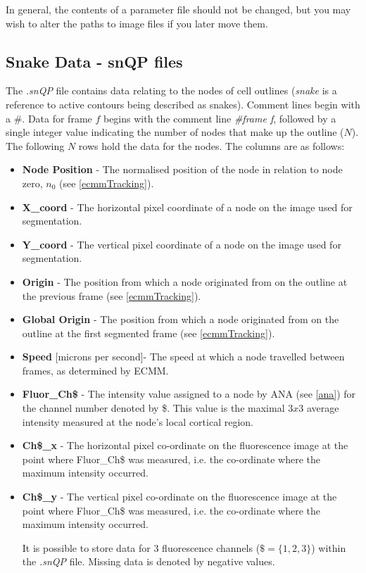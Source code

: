 \documentclass[a4paper,12pt]{article}
\begin{document}
In general, the contents of a parameter file should not be changed, but you may wish to alter the paths to
image files if you later move them.
 

\subsection{Snake Data - snQP files}
\label{snQP}

The \textit{.snQP} file contains data relating to the nodes of cell outlines (\textit{snake} is a reference to active contours being 
described as snakes).   Comment lines
begin with a \#.  Data for frame $f$ begins with the comment line \textit{\#frame f}, followed by a single integer value
indicating the number of nodes that make up the outline ($N$).  The following $N$ rows hold the data for the nodes. The 
columns are as follows:

\begin{itemize}

\item \textbf{Node Position} - The normalised position of the node in relation
to node zero, $n_{0}$ (see \autoref{ecmmTracking}).

\item \textbf{X\_coord} - The horizontal pixel coordinate of a node on the image used for segmentation.

\item  \textbf{Y\_coord} - The vertical pixel coordinate of a node on the image used for segmentation.

\item \textbf{Origin} - The position from which a node originated from on the outline
at the previous frame (see \autoref{ecmmTracking}).

\item \textbf{Global Origin} - The position from which a node originated from on the outline
at the first segmented frame (see \autoref{ecmmTracking}).

\item \textbf{Speed} [microns per second]- The speed at which a node travelled between frames, as determined by ECMM.

\item \textbf{Fluor\_Ch\$} - The intensity value assigned to a node by ANA (see \autoref{ana}) for the channel
number denoted by \$.  This value is the maximal $3x3$ average intensity measured at the node's local cortical region.

\item \textbf{Ch\$\_x} - The horizontal pixel co-ordinate on the fluorescence image at the point where Fluor\_Ch\$ was measured, i.e.
the co-ordinate where the maximum intensity occurred.

\item \textbf{Ch\$\_y} - The vertical pixel co-ordinate on the fluorescence image at the point where Fluor\_Ch\$ was measured, i.e.
the co-ordinate where the maximum intensity occurred.

It is possible to store data for 3 fluorescence channels ($\$=\{1,2,3\}$) within the \textit{.snQP} file. Missing 
data is denoted by negative values.

\end{itemize}
\end{document}
